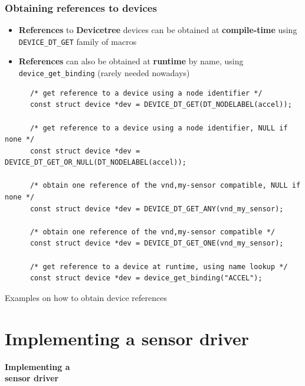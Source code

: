 \documentclass[handout]{beamer}
\begin{document}
\begin{frame}[fragile]
  \frametitle{Obtaining references to devices}

  \begin{itemize}
    \item \textbf{References} to \textbf{Devicetree} devices can be obtained
          at \textbf{compile-time} using \texttt{DEVICE\_DT\_GET} family of
          macros
    \item \textbf{References} can also be obtained at \textbf{runtime} by
          name, using \texttt{device\_get\_binding} (rarely needed nowadays)
  \end{itemize}

  \begin{listing}[H]
    \begin{verbatim}
      /* get reference to a device using a node identifier */
      const struct device *dev = DEVICE_DT_GET(DT_NODELABEL(accel));

      /* get reference to a device using a node identifier, NULL if none */
      const struct device *dev = DEVICE_DT_GET_OR_NULL(DT_NODELABEL(accel));

      /* obtain one reference of the vnd,my-sensor compatible, NULL if none */
      const struct device *dev = DEVICE_DT_GET_ANY(vnd_my_sensor);

      /* obtain one reference of the vnd,my-sensor compatible */
      const struct device *dev = DEVICE_DT_GET_ONE(vnd_my_sensor);
  
      /* get reference to a device at runtime, using name lookup */
      const struct device *dev = device_get_binding("ACCEL");
    \end{verbatim}
    \caption{Examples on how to obtain device references}
  \end{listing}
\end{frame}


\section{Implementing a sensor driver}

\begin{frame}
  \begin{center}
    \Huge \textbf{Implementing a\\sensor driver}
  \end{center}
\end{frame}
\end{document}
